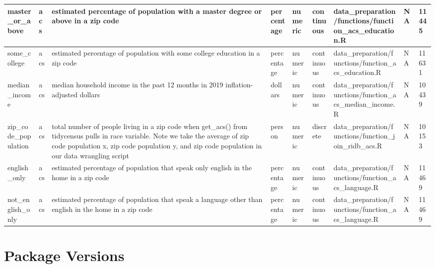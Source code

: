 \documentclass[
  11 pt,
  openany]{book}
\begin{document}
\begin{table}
\begin{tabular}[t]{l|l|l|l|l|l|l|l|l}
\hline
master\_or\_above & acs & estimated percentage of population with a master degree or above in a zip code & percentage & numeric & continuous & data\_preparation/functions/function\_acs\_education.R & NA & 11445\\
\hline
some\_college & acs & estimated percentage of population with some college education in a zip code & percentage & numeric & continuous & data\_preparation/functions/function\_acs\_education.R & NA & 11631\\
\hline
median\_income & acs & median household income in the past 12 months in 2019 inflation-adjusted dollars & dollars & numeric & continuous & data\_preparation/functions/function\_acs\_median\_income.R & NA & 10439\\
\hline
zip\_code\_population & acs & total number of people living in a zip code when get\_acs() from tidycensus pulls in race variable.  Note we take the average of zip code population x, zip code population y, and zip code population  in our data wrangling script & person & numeric & discrete & data\_preparation/functions/function\_join\_ridb\_acs.R & NA & 10153\\
\hline
english\_only & acs & estimated percentage of population that speak only english in the home in a zip code & percentage & numeric & continuous & data\_preparation/functions/function\_acs\_language.R & NA & 11469\\
\hline
not\_english\_only & acs & estimated percentage of population that speak a language other than english in the home in a zip code & percentage & numeric & continuous & data\_preparation/functions/function\_acs\_language.R & NA & 11469\\
\hline
\end{tabular}
\end{table}

\hypertarget{package-versions}{%
\section{Package Versions}\label{package-versions}}
\end{document}
